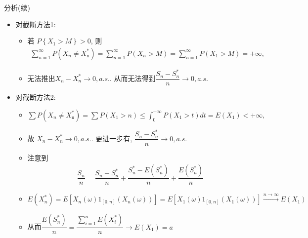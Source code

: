 \documentclass[Prob-All.tex]{subfiles}
\begin{document}
\begin{frame}{分析(续)}
	\begin{itemize}[<+-|alert@+>]
	\item 对截断方法1:
	\begin{itemize}[<+-|alert@+>]
	\item 若 $P\left\{X_{1}>M\right\} >0$, 则
	\begin{align*}
	   \sum_{n=1}^{\infty} P(X_{n} \neq X_{\mathrm{n}}^{*})=\sum_{n=1}^{\infty} P(X_{n}>M)=\sum_{n=1}^{\infty} P(X_{1}>M) =+\infty,
	\end{align*}
	\item 	无法推出$X_n-X_n^*\rightarrow 0, a.s.$. 从而无法得到$	  \dfrac{S_n-S_n^*}{n}\rightarrow 0, a.s.
	$


	\end{itemize}

	\item 对截断方法2:
	\begin{itemize}[<+-|alert@+>]
	\item $\sum P(X_{n} \neq X_{\mathrm{n}}^{*})=\sum P(X_{1}>n)\leq \int_{0}^{+\infty} P(X_{1}>t) d t=E\left(X_{1}\right)<+\infty,
	$
	\item 故 $X_n-X_n^*\rightarrow 0, a.s.$. 更进一步有, $\dfrac{S_n-S_n^*}{n}\rightarrow 0, a.s.$
	\item 注意到
	\begin{align*}
	  \dfrac{S_n}{n}=\dfrac{S_n-S_n^*}{n}+\dfrac{S_n^*-E(S_n^*)}{n}+\dfrac{E(S_n^*)}{n}
	\end{align*}
    \item $E(X_n^*)=E[X_{n}(\omega) 1_{[0, n]}\left(X_{n}(\omega)\right)]=E[X_{1}(\omega) 1_{[0, n]}\left(X_{1}(\omega)\right)]\stackrel{n\rightarrow \infty}{\longrightarrow} E(X_1)$
    \item 从而$\dfrac{E(S_n^*)}{n}=\dfrac{\sum_{i=1}^nE(X_i^*)}{n}\rightarrow E(X_1)=a$
	\end{itemize}

	\end{itemize}


\end{frame}
\end{document}
